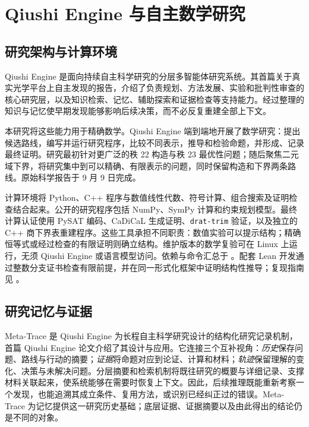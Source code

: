 \section{Qiushi Engine 与自主数学研究}\label{sec:research}

\subsection{研究架构与计算环境}

Qiushi Engine 是面向持续自主科学研究的分层多智能体研究系统。其首篇关于真实光学平台上自主发现的报告，介绍了负责规划、方法发展、实验和批判性审查的核心研究层，以及知识检索、记忆、辅助探索和证据检查等支持能力\cite{yang2026optical}。经过整理的知识与记忆使早期发现能够影响后续决策，而不必反复重建全部上下文。

本研究将这些能力用于精确数学。Qiushi Engine 端到端地开展了数学研究：提出候选路线，编写并运行研究程序，比较不同表示，推导和检验命题，并形成、记录最终证明。研究最初针对更广泛的秩 22 构造与秩 23 最优性问题；随后聚焦二元域下界，将研究集中到可以精确、有限表示的问题，同时保留构造和下界两条路线。原始科学报告于 9 月 9 日完成。

计算环境将 Python、C++ 程序与数值线性代数、符号计算、组合搜索及证明检查结合起来。公开的研究程序包括 NumPy、SymPy 计算和约束规划模型。最终计算认证使用 PySAT 编码、CaDiCaL 生成证明、\texttt{drat-trim} 验证，以及独立的 C++ 商下界表重建程序。这些工具承担不同职责：数值实验可以提示结构；精确恒等式或经过检查的有限证明则确立结构。维护版本的数学复验可在 Linux 上运行，无须 Qiushi Engine 或语言模型访问。依赖与命令汇总于 。配套 Lean 开发通过整数分支证书检查有限前提，并在同一形式化框架中证明结构性推导；复现指南见 。

\subsection{研究记忆与证据}

Meta-Trace 是 Qiushi Engine 为长程自主科学研究设计的结构化研究记录机制，首篇 Qiushi Engine 论文介绍了其设计与应用\cite{yang2026optical}。它连接三个互补视角：\emph{历史}保存问题、路线与行动的摘要；\emph{证据}将命题对应到论证、计算和材料；\emph{轨迹}保留理解的变化、决策与未解决问题。分层摘要和检索机制将既往研究的概要与详细记录、支撑材料关联起来，使系统能够在需要时恢复上下文。因此，后续推理既能重新考察一个发现，也能追溯其成立条件、复用方法，或识别已经纠正过的错误。Meta-Trace 为记忆提供这一研究历史基础；底层证据、证据摘要以及由此得出的结论仍是不同的对象。

